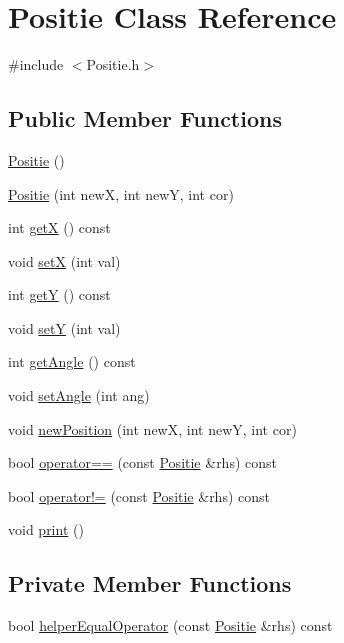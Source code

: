 \hypertarget{classPositie}{\section{Positie Class Reference}
\label{classPositie}
}


{\ttfamily \#include $<$Positie.\-h$>$}

\subsection*{Public Member Functions}
\begin{DoxyCompactItemize}
\item 
\hyperlink{classPositie_ab83d3eb64cbb064bd3aa8046b5ad5695}{Positie} ()
\item 
\hyperlink{classPositie_a32e5283bffdcfe28b28a27d0b2d04181}{Positie} (int new\-X, int new\-Y, int cor)
\item 
int \hyperlink{classPositie_a71dc2639feac7dc8d4f6f8a43bc7c98f}{get\-X} () const 
\item 
void \hyperlink{classPositie_a56f7076b52ce50e811ac5849f9631932}{set\-X} (int val)
\item 
int \hyperlink{classPositie_a42001a6907b4c6c360ffbf298923de75}{get\-Y} () const 
\item 
void \hyperlink{classPositie_ae230b789e2683561ac44f18162541da0}{set\-Y} (int val)
\item 
int \hyperlink{classPositie_a2b5bedcfc88cb380b8acb8dc27cb64e7}{get\-Angle} () const 
\item 
void \hyperlink{classPositie_ad6db714754c841515436dbbd73dc90ef}{set\-Angle} (int ang)
\item 
void \hyperlink{classPositie_a6ba64177362977ad0716ad9e06648799}{new\-Position} (int new\-X, int new\-Y, int cor)
\item 
bool \hyperlink{classPositie_adefdd66faaa3f410d5629a3affb88a47}{operator==} (const \hyperlink{classPositie}{Positie} \&rhs) const 
\item 
bool \hyperlink{classPositie_a320017884675a2c82af2bbcc7456e015}{operator!=} (const \hyperlink{classPositie}{Positie} \&rhs) const 
\item 
void \hyperlink{classPositie_a2124867ad0604af3aee6df0c1c9b438b}{print} ()
\end{DoxyCompactItemize}
\subsection*{Private Member Functions}
\begin{DoxyCompactItemize}
\item 
bool \hyperlink{classPositie_a38beabee21e6794fe6f7884f95fb5664}{helper\-Equal\-Operator} (const \hyperlink{classPositie}{Positie} \&rhs) const 
\end{DoxyCompactItemize}
